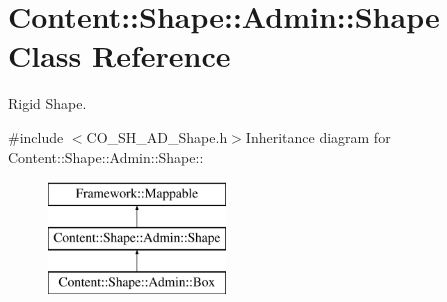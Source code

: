\hypertarget{classContent_1_1Shape_1_1Admin_1_1Shape}{
\section{Content::Shape::Admin::Shape Class Reference}
\label{classContent_1_1Shape_1_1Admin_1_1Shape}
}


Rigid Shape.  


{\ttfamily \#include $<$CO\_\-SH\_\-AD\_\-Shape.h$>$}Inheritance diagram for Content::Shape::Admin::Shape::\begin{figure}[H]
\begin{center}
\leavevmode
\includegraphics[height=3cm]{classContent_1_1Shape_1_1Admin_1_1Shape}
\end{center}
\end{figure}
